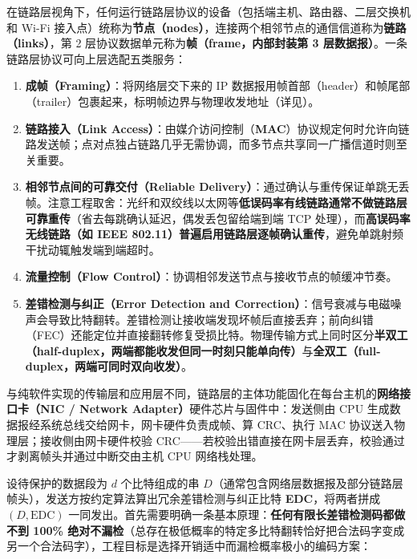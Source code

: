在链路层视角下，任何运行链路层协议的设备（包括端主机、路由器、二层交换机和 Wi-Fi 接入点）统称为\textbf{节点（nodes）}，连接两个相邻节点的通信信道称为\textbf{链路（links）}，第 2 层协议数据单元称为\textbf{帧（frame，内部封装第 3 层数据报）}。一条链路层协议可向上层选配五类服务：
\begin{enumerate}
\item \textbf{成帧（Framing）}：将网络层交下来的 IP 数据报用帧首部（header）和帧尾部（trailer）包裹起来，标明帧边界与物理收发地址（详见）。
\item \textbf{链路接入（Link Access）}：由媒介访问控制（\textbf{MAC}）协议规定何时允许向链路发送帧；点对点独占链路几乎无需协调，而多节点共享同一广播信道时则至关重要。
\item \textbf{相邻节点间的可靠交付（Reliable Delivery）}：通过确认与重传保证单跳无丢帧。注意工程取舍：光纤和双绞线以太网等\textbf{低误码率有线链路通常不做链路层可靠重传}（省去每跳确认延迟，偶发丢包留给端到端 TCP 处理），而\textbf{高误码率无线链路（如 IEEE 802.11）普遍启用链路层逐帧确认重传}，避免单跳射频干扰动辄触发端到端超时。
\item \textbf{流量控制（Flow Control）}：协调相邻发送节点与接收节点的帧缓冲节奏。
\item \textbf{差错检测与纠正（Error Detection and Correction）}：信号衰减与电磁噪声会导致比特翻转。差错检测让接收端发现坏帧后直接丢弃；前向纠错（FEC）还能定位并直接翻转修复受损比特。物理传输方式上同时区分\textbf{半双工（half-duplex，两端都能收发但同一时刻只能单向传）}与\textbf{全双工（full-duplex，两端可同时双向收发）}。
\end{enumerate}

与纯软件实现的传输层和应用层不同，链路层的主体功能固化在每台主机的\textbf{网络接口卡（NIC / Network Adapter）}硬件芯片与固件中：发送侧由 CPU 生成数据报经系统总线交给网卡，网卡硬件负责成帧、算 CRC、执行 MAC 协议送入物理层；接收侧由网卡硬件校验 CRC——若校验出错直接在网卡层丢弃，校验通过才剥离帧头并通过中断交由主机 CPU 网络栈处理。



设待保护的数据段为 $d$ 个比特组成的串 $D$（通常包含网络层数据报及部分链路层帧头），发送方按约定算法算出冗余差错检测与纠正比特 \textbf{EDC}，将两者拼成 $(D, \mathrm{EDC})$ 一同发出。首先需要明确一条基本原理：\textbf{任何有限长差错检测码都做不到 100\% 绝对不漏检}（总存在极低概率的特定多比特翻转恰好把合法码字变成另一个合法码字），工程目标是选择开销适中而漏检概率极小的编码方案：

